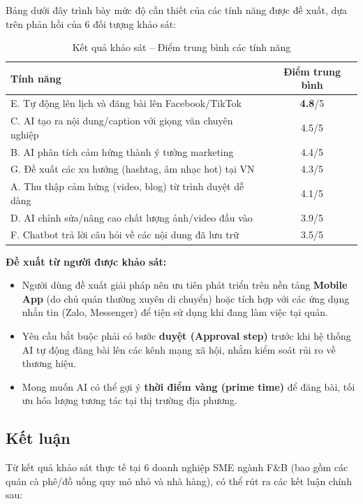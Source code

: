 Bảng dưới đây trình bày mức độ cần thiết của các tính năng được đề xuất,
dựa trên phản hồi của 6 đối tượng khảo sát:

\begin{table}[H]
\centering
\caption{Kết quả khảo sát – Điểm trung bình các tính năng}
\label{tab:ket_qua_khao_sat}
\small
\begin{tabular}{p{10cm} c}
\toprule
\textbf{Tính năng} & \textbf{Điểm trung bình} \\
\midrule
E. Tự động lên lịch và đăng bài lên Facebook/TikTok         & \textbf{4.8}/5 \\
C. AI tạo ra nội dung/caption với giọng văn chuyên nghiệp  & 4.5/5 \\
B. AI phân tích cảm hứng thành ý tưởng marketing           & 4.4/5 \\
G. Đề xuất các xu hướng (hashtag, âm nhạc hot) tại VN       & 4.3/5 \\
A. Thu thập cảm hứng (video, blog) từ trình duyệt dễ dàng   & 4.1/5 \\
D. AI chỉnh sửa/nâng cao chất lượng ảnh/video đầu vào       & 3.9/5 \\
F. Chatbot trả lời câu hỏi về các nội dung đã lưu trữ       & 3.5/5 \\
\bottomrule
\end{tabular}
\end{table}

\textbf{Đề xuất từ người được khảo sát:}

\begin{itemize}
\item
  Người dùng đề xuất giải pháp nên ưu tiên phát triển trên nền tảng
  \textbf{Mobile App} (do chủ quán thường xuyên di chuyển) hoặc tích hợp
  với các ứng dụng nhắn tin (Zalo, Messenger) để tiện sử dụng khi đang
  làm việc tại quán.
\item
  Yêu cầu bắt buộc phải có bước \textbf{duyệt (Approval step)} trước khi
  hệ thống AI tự động đăng bài lên các kênh mạng xã hội, nhằm kiểm soát
  rủi ro về thương hiệu.
\item
  Mong muốn AI có thể gợi ý \textbf{thời điểm vàng (prime time)} để đăng
  bài, tối ưu hóa lượng tương tác tại thị trường địa phương.
\end{itemize}

\subsection{Kết luận}\label{kux1ebft-luux1eadn}

Từ kết quả khảo sát thực tế tại 6 doanh nghiệp SME ngành F\&B (bao gồm
các quán cà phê/đồ uống quy mô nhỏ và nhà hàng), có thể rút ra các kết
luận chính sau:

